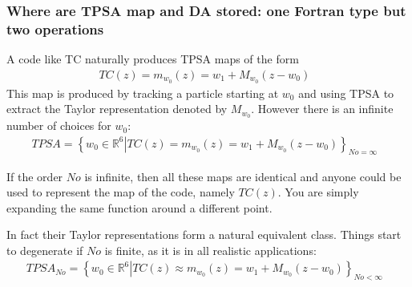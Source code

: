 \documentclass{hitec}     %
\begin{document}
{{{{\subsubsection{Where are  TPSA map and DA stored: one  Fortran type but two operations}\label{s:storage}

A code like TC naturally produces TPSA maps of the form
%
\begin{align}TC(z)=
{m}_{{w}_{0}}\left({z}\right)={w}_{1}+{M}_{{w}_{0}}(z-{w}_{0})~~~\label{eq:tpsamap} \end{align}
%
%
This map is produced by tracking a particle starting at  ${w}_{0}$ and using TPSA to extract the Taylor representation denoted by ${M}_{{w}_{0}}$.  However there is an infinite number of choices for $w_0$:
%
\begin{align}TPSA=
{\left\{{{w}_{0}\in {\mathbb{R}}^{6}\left|{TC(z)=
{m}_{{w}_{0}}\left({z}\right)={w}_{1}+{M}_{{w}_{0}}(z-{w}_{0})}\right.}\right\}}_{No=
\infty }~~~\label{eq:tpsamapd} \end{align}

If the order $No$ is infinite, then all these maps are identical and anyone could be used to represent the map of the code, namely $TC(z)$. You are simply expanding the same function around a different point.

In fact their Taylor representations form a natural equivalent class. Things start to degenerate if $No$ is finite, as it is in all realistic applications:
%
\begin{align}{TPSA}_{No}=
{\left\{{{w}_{0}\in {\mathbb{R}}^{6}\left|{TC(z)\approx {m}_{{w}_{0}}\left({z}\right)={w}_{1}+{M}_{{w}_{0}}(z-{w}_{0})}\right.}\right\}}_{No<\infty }~~~\label{eq:tpsamapda} \end{align}

}}}}
\end{document}
